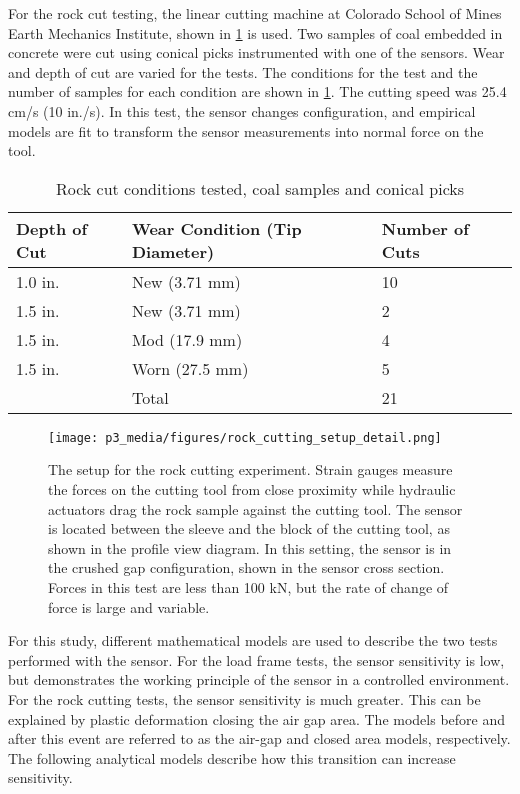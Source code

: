 For the rock cut testing, the linear cutting machine at Colorado School of Mines
Earth Mechanics Institute, shown in \ref{fig:lcm} is used. 
Two samples of coal embedded in concrete were cut 
using conical picks instrumented with one of the sensors.
Wear and depth of cut are varied for the tests.
The conditions for the test and the number of samples for each condition are shown in \ref{tab:data}.
The cutting speed was 25.4 cm/s (10 in./s).
In this test, the sensor changes configuration,
and empirical models are fit to transform the sensor measurements into 
normal force on the tool.

\begin{table}[]
\centering
\caption{Rock cut conditions tested, coal samples and conical picks}
\label{tab:data}
\begin{tabular}{|l|l|l|}
\hline
Depth of Cut             & Wear Condition (Tip Diameter) & Number of Cuts \\ \hline
1.0 in.                  & New (3.71 mm)  & 10             \\ \hline
1.5 in.                  & New (3.71 mm)  & 2              \\ \hline
1.5 in.                  & Mod (17.9 mm)  & 4              \\ \hline
1.5 in.                  & Worn (27.5 mm) & 5              \\ \hline
 & Total & 21 \\ \hline
\end{tabular}
\end{table}

\begin{figure}
\centering
\texttt{[image: p3\_media/figures/rock\_cutting\_setup\_detail.png]}
\caption{The setup for the rock cutting experiment. Strain gauges measure the forces on the cutting tool from
close proximity while hydraulic actuators drag the rock sample against the cutting tool. The sensor is 
located between the sleeve and the block of the cutting tool, as shown in the profile view diagram.
In this setting, the sensor is in the crushed gap configuration, shown in the sensor cross section.
Forces in this test are less than 100 kN, but the rate of change of force is large and variable.}
\label{fig:lcm}
\end{figure}

For this study, different mathematical models are used to describe the 
two tests performed with the sensor.
For the load frame tests, the sensor sensitivity is low, but demonstrates
the working principle of the sensor in a controlled environment.
For the rock cutting tests, the sensor sensitivity is much greater.
This can be explained by plastic deformation closing the air gap area. 
The models before and after this event are referred to as the 
air-gap and closed area models, respectively.
The following analytical models describe how this
transition can increase sensitivity.

